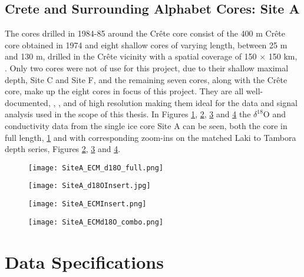 \documentclass[../../CompleteThesis/Complete_1stDraft]{subfiles}
\begin{document}
\subsection[Crete Area][Crete Area]{Crete and Surrounding Alphabet Cores: Site A}
\label{Subsec:Data_Selection_Alhabet}
The cores drilled in 1984-85 around the Crête core consist of the 400 m Crête core obtained in 1974 \cite{bibid} and eight shallow cores of varying length, between 25 m and 130 m, drilled in the Crête vicinity with a spatial coverage of 150 $\times$ 150 km, \cite[Clausen, Gundestrup, Johnsen 1988]{Clausen1988}.
Only two cores were not of use for this project, due to their shallow maximal depth, Site C and Site F, and the remaining seven cores, along with the Crête core, make up the eight cores in focus of this project. They are all well-documented, \cite[Clausen \& Hammer, 1988]{ClausenHammer1988}, \cite[Clausen, Gundestrup, Johnsen 1988]{Clausen1988}, and of high resolution making them ideal for the data and signal analysis used in the scope of this thesis. In Figures \ref{fig:SiteA__ECM_d18O_full.png}, \ref{fig:SiteA_d18OInsert}, \ref{fig:SiteA_ECMInsert} and \ref{fig:SiteA_ECMd18O_combo} the $\delta^{18}$O and conductivity data from the single ice core Site A can be seen, both the core in full length, \ref{fig:SiteA__ECM_d18O_full.png} and with corresponding zoom-ins on the matched Laki to Tambora depth series, Figures \ref{fig:SiteA_d18OInsert}, \ref{fig:SiteA_ECMInsert} and \ref{fig:SiteA_ECMd18O_combo}.
\begin{figure}[h]
	\centering
	\texttt{[image: SiteA\_ECM\_d18O\_full.png]}
	\caption[]{}
	\label{fig:SiteA__ECM_d18O_full.png}
\end{figure}

\begin{figure}[h]
	\centering
	\texttt{[image: SiteA\_d18OInsert.jpg]}
	\caption[]{}
	\label{fig:SiteA_d18OInsert}
\end{figure}

\begin{figure}[h]
	\centering
	\texttt{[image: SiteA\_ECMInsert.png]}
	\caption[]{}
	\label{fig:SiteA_ECMInsert}
\end{figure}

\begin{figure}[h]
	\centering
	\texttt{[image: SiteA\_ECMd18O\_combo.png]}
	\caption[]{}
	\label{fig:SiteA_ECMd18O_combo}
\end{figure}

\section[Data Specifications][Data Specifications]{Data Specifications}
\label{Sec:Data_Specifications}
\end{document}
